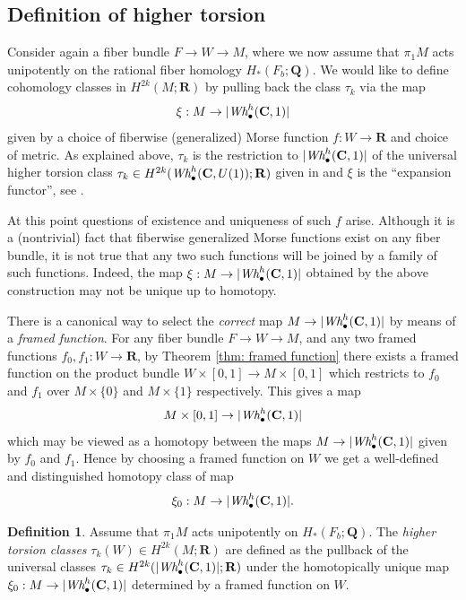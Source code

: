 \documentclass{amsart}
\def\bC{\mathbf{C}}
\def\bQ{\mathbf{Q}}
\def\bR{\mathbf{R}}
\theoremstyle{definition}
\newtheorem{definition}[theorem]{Definition}
\theoremstyle{remark}
\newtheorem{inductive lemma}[theorem]{Inductive Lemma}
\begin{document}
\subsection{Definition of higher torsion}

Consider again a fiber bundle $F \to W \to M$, where we now assume that $\pi_1 M$ acts unipotently on the rational fiber homology $H_*(F_b;\bQ)$. We would like to define cohomology classes in $H^{2k}(M;\bR)$ by pulling back the class $\tau_{k}$ via the map $$\xi:M \to |\text{\em Wh}_\bullet^h(\bC,1)| $$ given by a choice of fiberwise (generalized) Morse function $f:W \to \bR$ and choice of metric. 
As explained above, $\tau_k$ is the restriction to $|\text{\em Wh}_\bullet^h(\bC,1)|$ of the universal higher torsion class $\tau_k\in H^{2k}(\text{\em Wh}_\bullet^h(\bC,U(1));\bR)$ given in \cite[subsection 2.7]{I05} and $\xi$ is the ``expansion functor'', see \cite[Def 2.18]{I05}.

At this point questions of existence and uniqueness of such $f$ arise. Although it is a (nontrivial) fact that fiberwise generalized Morse functions exist on any fiber bundle, it is not true that any two such functions will be joined by a family of such functions. Indeed, the map $\xi:M \to |\text{\em Wh}_\bullet^h(\bC,1)| $ obtained by the above construction may not be unique up to homotopy. 

There is a canonical way to select the {\em correct} map $M \to |\text{\em Wh}_\bullet^h(\bC,1)| $ by means of a {\em framed function}. For any fiber bundle $F\to W \to M$, and any two framed functions $f_0,f_1:W \to \bR$, by Theorem \ref{thm: framed function} there exists a framed function on the product bundle $W \times [0,1] \to M \times [0,1]$ which restricts to $f_0$ and $f_1$ over $M \times \{0\}$ and $M \times \{1\}$ respectively. This gives a map 
$$M \times [0,1] \to  |\text{\em Wh}_\bullet^h(\bC,1)|$$
which may be viewed as a homotopy between the maps $M \to|\text{\em Wh}_\bullet^h(\bC,1)| $ given by $f_0$ and $f_1$. Hence by choosing a framed function on $W$ we get a well-defined and distinguished homotopy class of map
 $$\xi_0: M \to |\text{\em Wh}_\bullet^h(\bC,1)| .$$

\begin{definition}  Assume that $\pi_1 M$ acts unipotently on $H_*(F_b;\bQ)$. The {\em higher torsion classes} $\tau_{k}(W) \in H^{2k}(M;\bR)$  are defined as the pullback of the universal classes $\tau_{k} \in H^{2k}( |\text{\em Wh}_\bullet^h(\bC,1)| ;\bR)$ under the homotopically unique map $\xi_0: M \to |\text{\em Wh}_\bullet^h(\bC,1)| $ determined by a framed function on $W$. \end{definition} 
\end{document}
